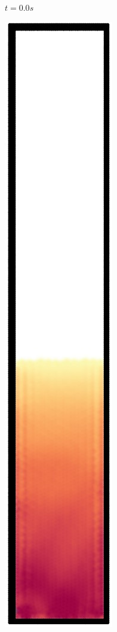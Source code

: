 \begin{figure}[h]
\begin{subfigure}[t]{0.09\textwidth}
    \caption{\small{$t=0.0s$}}
  \end{subfigure}%
  \begin{subfigure}[t]{0.09\textwidth}
    \includegraphics[width=\textwidth]{images/oscillate/020.jpg}

\end{subfigure}
\end{figure}
